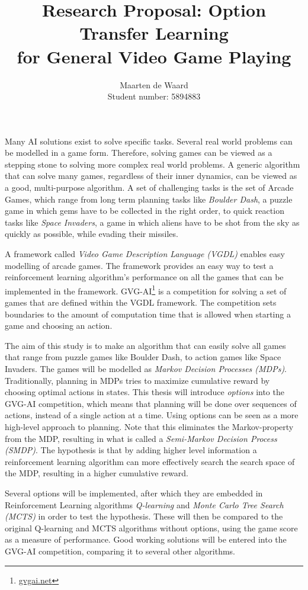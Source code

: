 \documentclass[a4paper,10pt]{article}
\title{Research Proposal: Option Transfer Learning\\for General Video Game Playing}
\author{Maarten de Waard\\\small Student number: 5894883}
\begin{document}
\maketitle
\vspace{-.5cm}
Many AI solutions exist to solve specific tasks. Several real world problems can
be modelled in a game form. Therefore, solving games can be viewed as a
stepping stone to solving more complex real world problems. A generic algorithm
that can solve many games, regardless of their inner dynamics, can be viewed as
a good, multi-purpose algorithm. A set of challenging tasks is the set of Arcade
Games, which range from long term planning tasks like \emph{Boulder Dash}, a
puzzle game in which gems have to be collected in the right order, to quick
reaction tasks like \emph{Space Invaders}, a game in which aliens have to be
shot from the sky as quickly as possible, while evading their missiles.

A framework called \emph{Video Game Description Language (VGDL)} enables easy modelling
of arcade games. The framework provides an easy way to test a
reinforcement learning algorithm's performance on all the games that can be
implemented in the framework. 
GVG-AI\footnote{\url{gvgai.net}} is a competition for solving a set of games
that are defined within the VGDL framework. The competition sets boundaries to
the amount of computation time that is allowed when starting a game and choosing
an action.

The aim of this study is to make an algorithm that can easily solve all games
that range from puzzle games like Boulder Dash, to action games like Space
Invaders. The games will be modelled as \emph{Markov Decision Processes (MDPs)}.
Traditionally, planning in MDPs tries to maximize cumulative reward by choosing
optimal actions in states. This thesis will introduce
\emph{options}\cite{sutton1999between} into the GVG-AI competition, which means
that planning will be done over sequences of actions, instead of
a single action at a time. Using options can be seen as a more high-level approach to
planning. Note that this eliminates the Markov-property from the MDP, resulting
in what is called a \emph{Semi-Markov Decision Process (SMDP)}. The hypothesis
is that by adding higher level information a reinforcement
learning algorithm can more effectively search the search space of the MDP,
resulting in a higher cumulative reward.

Several options will be implemented, after which they are embedded in
Reinforcement Learning algorithms \emph{Q-learning} and \emph{Monte Carlo Tree
Search (MCTS)} in order to test the hypothesis. These will then be compared to
the original Q-learning and MCTS algorithms without options, using the game
score as a measure of performance. Good working solutions will be entered into
the GVG-AI competition, comparing it to several other algorithms.
\end{document}
